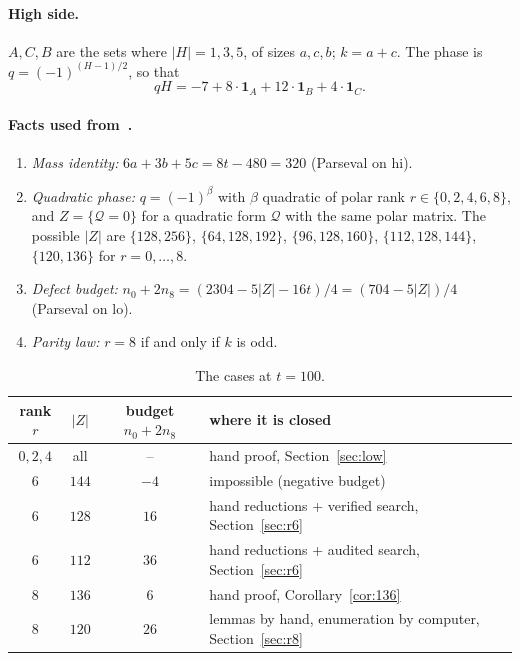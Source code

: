 \documentclass[11pt]{article}
\theoremstyle{definition}
\theoremstyle{remark}
\newcommand{\ind}{\mathbf{1}}
\newcommand{\lo}{\mathrm{lo}}
\newcommand{\hi}{\mathrm{hi}}
\DeclareRobustCommand{\_}{\textunderscore\allowbreak}
\newcommand{\main}{\cite{Main}}
\begin{document}
\paragraph{High side.} $A,C,B$ are the sets where $|H|=1,3,5$, of sizes $a,c,b$; $k=a+c$. The phase is $q=(-1)^{(H-1)/2}$, so that
\begin{equation}\label{eq:qH}
  qH=-7+8\cdot\ind_A+12\cdot\ind_B+4\cdot\ind_C .
\end{equation}

\paragraph{Facts used from~\main{}.}
\begin{enumerate}[label=(F\arabic*),nosep]
\item\label{F:mass} \emph{Mass identity:} $6a+3b+5c=8t-480=320$ (Parseval on $\hi$).
\item\label{F:phase} \emph{Quadratic phase:} $q=(-1)^{\beta}$ with $\beta$ quadratic of polar rank $r\in\{0,2,4,6,8\}$, and $Z=\{\mathcal Q=0\}$ for a quadratic form $\mathcal Q$ with the same polar matrix. The possible $|Z|$ are $\{128,256\}$, $\{64,128,192\}$, $\{96,128,160\}$, $\{112,128,144\}$, $\{120,136\}$ for $r=0,\dots,8$.
\item\label{F:budget} \emph{Defect budget:} $n_0+2n_8=(2304-5|Z|-16t)/4=(704-5|Z|)/4$ (Parseval on $\lo$).
\item\label{F:parity} \emph{Parity law:} $r=8$ if and only if $k$ is odd.
\end{enumerate}

\begin{table}[ht]
\centering
\begin{tabular}{@{}cccl@{}}
\toprule
rank $r$ & $|Z|$ & budget $n_0+2n_8$ & where it is closed\\
\midrule
$0,2,4$ & all & -- & hand proof, Section~\ref{sec:low}\\
$6$ & $144$ & $-4$ & impossible (negative budget)\\
$6$ & $128$ & $16$ & hand reductions + verified search, Section~\ref{sec:r6}\\
$6$ & $112$ & $36$ & hand reductions + audited search, Section~\ref{sec:r6}\\
$8$ & $136$ & $6$ & hand proof, Corollary~\ref{cor:136}\\
$8$ & $120$ & $26$ & lemmas by hand, enumeration by computer, Section~\ref{sec:r8}\\
\bottomrule
\end{tabular}
\caption{The cases at $t=100$.}
\label{tab:cases}
\end{table}
\end{document}
